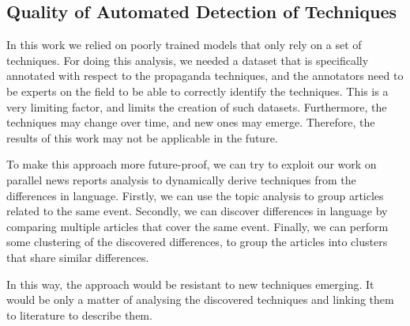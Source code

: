 \subsection{Quality of Automated Detection of Techniques}

In this work we relied on poorly trained models that only rely on a set of techniques. For doing this analysis, we needed a dataset that is specifically annotated with respect to the propaganda techniques, and the annotators need to be experts on the field to be able to correctly identify the techniques. This is a very limiting factor, and limits the creation of such datasets. Furthermore, the techniques may change over time, and new ones may emerge. Therefore, the results of this work may not be applicable in the future.

To make this approach more future-proof,
we can try to exploit our work on parallel news reports analysis to dynamically derive techniques from the differences in language.
Firstly, we can use the topic analysis to group articles related to the same event.
Secondly, we can discover differences in language by comparing multiple articles that cover the same event.
Finally, we can perform some clustering of the discovered differences, to group the articles into clusters that share similar differences.


In this way, the approach would be resistant to new techniques emerging. It would be only a matter of analysing the discovered techniques and linking them to literature to describe them.



